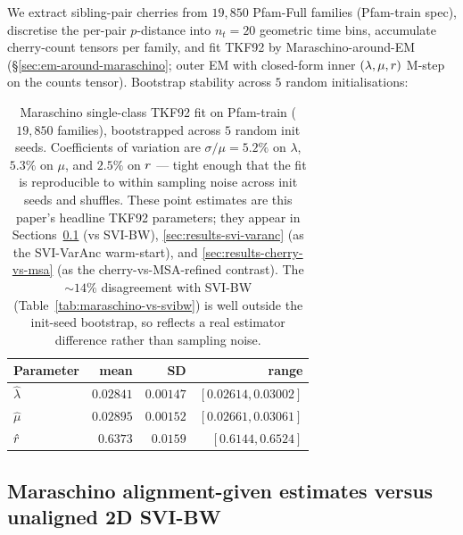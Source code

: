 We extract sibling-pair cherries from $19{,}850$ Pfam-Full
families (Pfam-train spec), discretise the per-pair $p$-distance
into $n_t = 20$ geometric time bins, accumulate cherry-count
tensors per family, and fit TKF92 by Maraschino-around-EM
(\S\ref{sec:em-around-maraschino}; outer EM with closed-form
inner $(\lambda, \mu, r)$ M-step on the counts tensor).
Bootstrap stability across $5$ random initialisations:

\begin{table}[ht]
\centering\small
\begin{tabular}{lrrr}
\toprule
Parameter & mean & SD & range \\
\midrule
$\hat\lambda$ & $0.02841$ & $0.00147$ & $[0.02614, 0.03002]$ \\
$\hat\mu$     & $0.02895$ & $0.00152$ & $[0.02661, 0.03061]$ \\
$\hat{r}$  & $0.6373$  & $0.0159$  & $[0.6144, 0.6524]$  \\
\bottomrule
\end{tabular}
\caption{Maraschino single-class TKF92 fit on Pfam-train
($19{,}850$ families), bootstrapped across $5$ random init seeds.
Coefficients of variation are $\sigma/\mu = 5.2\%$ on $\lambda$,
$5.3\%$ on $\mu$, and $2.5\%$ on $r$ --- tight enough that the
fit is reproducible to within sampling noise across init seeds and
shuffles.  These point estimates are this paper's headline TKF92
parameters; they appear in
Sections~\ref{sec:results-svibw} (vs SVI-BW),
\ref{sec:results-svi-varanc} (as the SVI-VarAnc warm-start), and
\ref{sec:results-cherry-vs-msa} (as the cherry-vs-MSA-refined
contrast).  The $\sim 14\%$ disagreement with SVI-BW
(Table~\ref{tab:maraschino-vs-svibw}) is well outside the
init-seed bootstrap, so reflects a real estimator difference
rather than sampling noise.}
\label{tab:maraschino-pfam-bootstrap}
\end{table}

\subsection{Maraschino alignment-given estimates versus unaligned 2D SVI-BW}
\label{sec:results-svibw}


